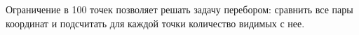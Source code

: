 \solutionSection

Ограничение в 100 точек позволяет решать задачу перебором: сравнить все пары координат и подсчитать для каждой точки количество видимых с нее.

\codeExample

